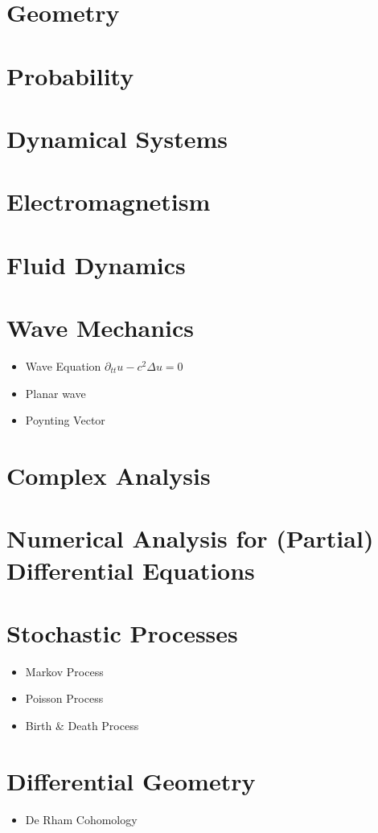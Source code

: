 \documentclass[10pt]{article}
\begin{document}
\section{Geometry}
\section{Probability}
\section{Dynamical Systems}
\section{Electromagnetism}
\section{Fluid Dynamics}
\section{Wave Mechanics}
	\begin{itemize}
	\item Wave Equation $\partial_{tt} u-c^2\Delta u=0$
	\item Planar wave
	\item Poynting Vector
	\end{itemize}
\section{Complex Analysis}
\section{Numerical Analysis for (Partial) Differential Equations}
\section{Stochastic Processes}
\begin{itemize}
	\item Markov Process
	\item Poisson Process
	\item Birth \& Death Process
\end{itemize}
\section{Differential Geometry}
\begin{itemize}
	\item De Rham Cohomology
\end{itemize}
\end{document}
